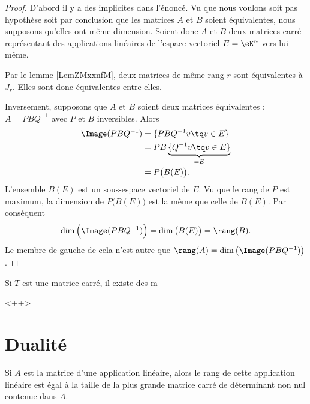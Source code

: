 \begin{proof}
    D'abord il y a des implicites dans l'énoncé. Vu que nous voulons soit pas hypothèse soit par conclusion que les matrices $A$ et \( B\) soient équivalentes, nous supposons qu'elles ont même dimension. Soient donc \( A\) et \( B\) deux matrices carré représentant des applications linéaires de l'espace vectoriel \( E=\eK^n\) vers lui-même.

    Par le lemme \ref{LemZMxxnfM}, deux matrices de même rang \( r\) sont équivalentes à \( J_r\). Elles sont donc équivalentes entre elles.

    Inversement, supposons que \( A\) et \( B\) soient deux matrices équivalentes : \( A=PBQ^{-1}\) avec \( P\) et \( B\) inversibles. Alors
    \begin{subequations}
        \begin{align}
            \Image(PBQ^{-1})&=\{ PBQ^{-1}v\tq v\in E \}\\
            &=PB\underbrace{\{ Q^{-1}v\tq v\in E \}}_{=E}\\
            &=P\big( B(E) \big).
        \end{align}
    \end{subequations}
    L'ensemble \( B(E)\) est un sous-espace vectoriel de \( E\). Vu que le rang de \( P\) est maximum, la dimension de \( P\big( B(E) \big)\) est la même que celle de \( B(E)\). Par conséquent
    \begin{equation}
        \dim\Big( \Image(PBQ^{-1}) \Big)=\dim\big( B(E) \big)=\rang(B).
    \end{equation}
    Le membre de gauche de cela n'est autre que \( \rang(A)=\dim\big( \Image(PBQ^{-1}) \big)\).
\end{proof}

\begin{corollary}
    Si \( T\) est une matrice carré, il existe des m
\end{corollary}
<++>

\section{Dualité}

\begin{proposition} \label{PropEJBZooTNFPRj}
    Si $A$ est la matrice d'une application linéaire, alors le rang de cette application linéaire est égal à la taille de la plus grande matrice carré de déterminant non nul contenue dans $A$.
\end{proposition}

